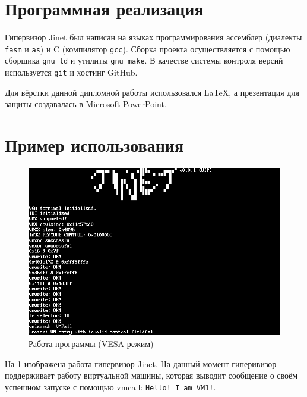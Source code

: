 \documentclass[a4paper,11pt]{extarticle}
\begin{document}
	\section{Программная реализация}
	Гипервизор Jinet был написан на языках программирования ассемблер (диалекты \texttt{fasm} и \texttt{as}) и C (компилятор \texttt{gcc}). Сборка проекта осуществляется с помощью сборщика \texttt{gnu ld} и утилиты \texttt{gnu make}. В качестве системы контроля версий используется \texttt{git} и хостинг GitHub.\par
	Для вёрстки данной дипломной работы использовался \LaTeX, а презентация для защиты создавалась в Microsoft PowerPoint.
	\section{Пример использования}
	\begin{figure}[htb]
		\centering
		\includegraphics[width=0.55\linewidth]{../diagrams/jinet_vesa.png}
		\caption{Работа программы (VESA-режим)}
		\label{fig:jinetvesa}
	\end{figure}
	На \cref{fig:jinetvesa} изображена работа гипервизор Jinet. На данный момент гиперивизор поддерживает работу виртуальной машины, которая выводит сообщение о своём успешном запуске с помощью vmcall: \texttt{Hello! I am VM1!}.
\end{document}
